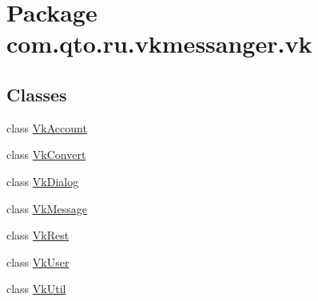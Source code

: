\hypertarget{namespacecom_1_1qto_1_1ru_1_1vkmessanger_1_1vk}{}\section{Package com.\+qto.\+ru.\+vkmessanger.\+vk}
\label{namespacecom_1_1qto_1_1ru_1_1vkmessanger_1_1vk}
\subsection*{Classes}
\begin{DoxyCompactItemize}
\item 
class \hyperlink{classcom_1_1qto_1_1ru_1_1vkmessanger_1_1vk_1_1_vk_account}{Vk\+Account}
\item 
class \hyperlink{classcom_1_1qto_1_1ru_1_1vkmessanger_1_1vk_1_1_vk_convert}{Vk\+Convert}
\item 
class \hyperlink{classcom_1_1qto_1_1ru_1_1vkmessanger_1_1vk_1_1_vk_dialog}{Vk\+Dialog}
\item 
class \hyperlink{classcom_1_1qto_1_1ru_1_1vkmessanger_1_1vk_1_1_vk_message}{Vk\+Message}
\item 
class \hyperlink{classcom_1_1qto_1_1ru_1_1vkmessanger_1_1vk_1_1_vk_rest}{Vk\+Rest}
\item 
class \hyperlink{classcom_1_1qto_1_1ru_1_1vkmessanger_1_1vk_1_1_vk_user}{Vk\+User}
\item 
class \hyperlink{classcom_1_1qto_1_1ru_1_1vkmessanger_1_1vk_1_1_vk_util}{Vk\+Util}
\end{DoxyCompactItemize}
